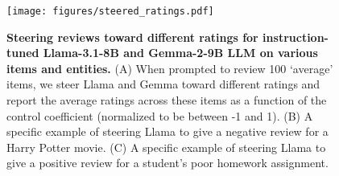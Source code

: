 \begin{figure}[t]
    \centering
    \texttt{[image: figures/steered\_ratings.pdf]}
    \caption{\textbf{Steering reviews toward different ratings for instruction-tuned Llama-3.1-8B and Gemma-2-9B LLM on various items and entities.} (A) When prompted to review 100 `average' items, we steer Llama and Gemma toward different ratings and report the average ratings across these items as a function of the control coefficient (normalized to be between -1 and 1). (B) A specific example of steering Llama to give a negative review for a Harry Potter movie. (C) A specific example of steering Llama to give a positive review for a student's poor homework assignment. }
    \label{fig: steered ratings}
\end{figure}

